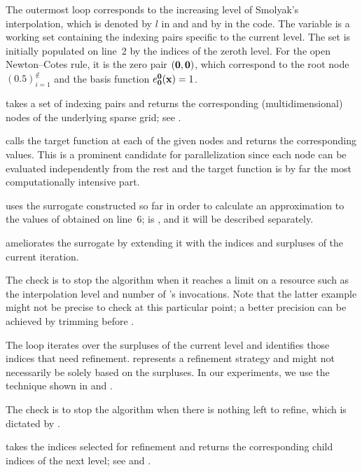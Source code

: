 \begin{compactlist}

 The outermost loop corresponds to the increasing level of
Smolyak's interpolation, which is denoted by $l$ in  and
 and by  in the code. The 
variable is a working set containing the indexing pairs specific to the current
level. The set is initially populated on line~2 by the indices of the zeroth
level. For the open Newton--Cotes rule, it is the zero pair $(\mathbf{0}, \mathbf{0})$,
which correspond to the root node $(0.5)_{i = 1}^\nin$ and the basis function
$e^{\mathbf{0}}_{\mathbf{0}}(\mathbf{x}) = 1$.

  takes a set of indexing pairs and returns
the corresponding (multidimensional) nodes of the underlying sparse grid; see
.

  calls the target function at each of the given
nodes and returns the corresponding values. This is a prominent candidate for
parallelization since each node can be evaluated independently from the rest and
the target function is by far the most computationally intensive part.

  uses the surrogate constructed so far in order
to calculate an approximation to the values of  obtained on
line~6;  is , and it will be described
separately.

  ameliorates the surrogate by extending it with
the indices and surpluses of the current iteration.

 The check is to stop the algorithm when it reaches a limit on a
resource such as the interpolation level and number of 's
invocations. Note that the latter example might not be precise to check at this
particular point; a better precision can be achieved by trimming 
before .

 The loop iterates over the surpluses of the current level and
identifies those indices that need refinement. 
represents a refinement strategy and might not necessarily be solely based on
the surpluses. In our experiments, we use the technique shown in
 and .

 The check is to stop the algorithm when there is nothing left
to refine, which is dictated by .

  takes the indices selected for
refinement and returns the corresponding child indices of the next level; see
 and .

\end{compactlist}

